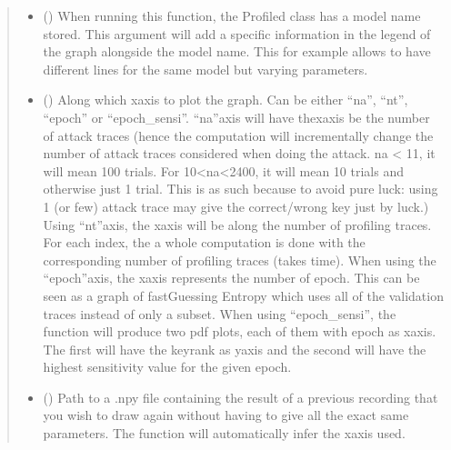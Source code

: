 \documentclass[letterpaper,10pt,english]{sphinxmanual}
\begin{document}
\begin{fulllineitems}
\begin{fulllineitems}
\begin{quote}
\begin{description}
\begin{itemize}
\item {} 
\sphinxAtStartPar
{} (\sphinxstyleliteralemphasis{\sphinxupquote{, }}) \textendash{} When running this function, the Profiled class has a model name stored. This argument will add
a specific information in the legend of the graph alongside the model name. This for example
allows to have different lines for the same model but varying parameters.

\item {} 
\sphinxAtStartPar
{} (\sphinxstyleliteralemphasis{\sphinxupquote{, }}) \textendash{} Along which x\sphinxhyphen{}axis to plot the graph. Can be either “na”, “nt”, “epoch” or “epoch\_sensi”. “na”\sphinxhyphen{}axis
will have thex\sphinxhyphen{}axis be the number of attack traces (hence the computation will incrementally change
the number of attack traces considered when doing the attack. na \textless{} 11, it will mean 100 trials. For
10\textless{}na\textless{}2400, it will mean 10 trials and otherwise just 1 trial. This is as such because to avoid pure
luck: using 1 (or few) attack trace may give the correct/wrong key just by luck.) Using “nt”\sphinxhyphen{}axis, the
x\sphinxhyphen{}axis will be along the number of profiling traces. For each index, the a whole computation is done with
the corresponding number of profiling traces (takes time). When using the “epoch”\sphinxhyphen{}axis, the x\sphinxhyphen{}axis
represents the number of epoch. This can be seen as a graph of fast\sphinxhyphen{}Guessing Entropy which uses
all of the validation traces instead of only a subset. When using “epoch\_sensi”, the function will produce
two pdf plots, each of them with epoch as x\sphinxhyphen{}axis. The first will have the key\sphinxhyphen{}rank as y\sphinxhyphen{}axis and the second
will have the highest sensitivity value for the given epoch.

\item {} 
\sphinxAtStartPar
{} (\sphinxstyleliteralemphasis{\sphinxupquote{, }}) \textendash{} Path to a .npy file containing the result of a previous recording that you wish to draw again without having
to give all the exact same parameters. The function will automatically infer the x\sphinxhyphen{}axis used.


\end{itemize}
\end{description}
\end{quote}
\end{fulllineitems}
\end{fulllineitems}
\end{document}
